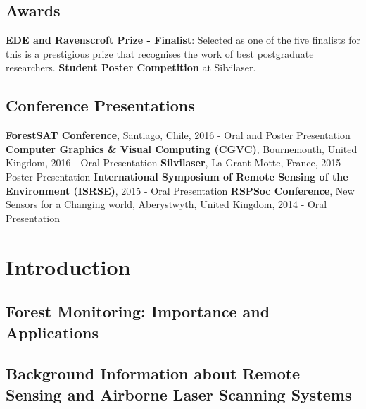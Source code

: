 \documentclass[11pt,nofootinbib]{report}
\begin{document}
	
	\section{Awards}
		\textbf{EDE and Ravenscroft Prize - Finalist}: Selected as one of the five finalists for this is a prestigious prize that recognises the work of best postgraduate researchers.\newline
		\textbf{Student Poster Competition} at Silvilaser.
		
	
	\section{Conference Presentations}
		\textbf{ForestSAT Conference}, Santiago, Chile, 2016 - Oral and Poster Presentation \newline
		\textbf{Computer Graphics \& Visual Computing (CGVC)}, Bournemouth, United Kingdom, 2016 - Oral Presentation \newline
		\textbf{Silvilaser}, La Grant Motte, France, 2015 - Poster Presentation \newline
		\textbf{International Symposium of Remote Sensing of the Environment 	(ISRSE)}, 2015 - Oral Presentation\newline
		\textbf{RSPSoc Conference}, New Sensors for a Changing world, Aberystwyth, United Kingdom, 2014 - Oral Presentation \newline
	
	
	

    \tableofcontents	 
		\newpage  
	\cleardoublepage
	\listoffigures
	
	
		
		
	\setcounter{secnumdepth}{4}		

	\chapter{Introduction} \label{Introduction} 	
		\section{Forest Monitoring: Importance and Applications}
			
		\section{Background Information about Remote Sensing and Airborne Laser Scanning Systems}\label{Background}
			
			\newpage
		
\end{document}
